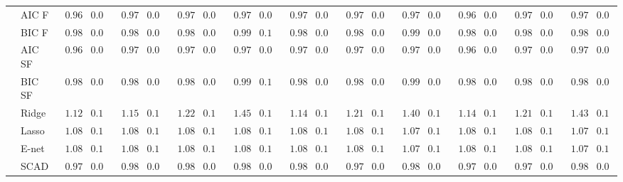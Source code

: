 \begin{tabular}{ll|ll|llllll|llllll|llllll}
 & AIC F  & $\phantom{0}0.96$ & $0.09$ & $\phantom{0}0.97$ & $0.09$ & $\phantom{0}0.97$ & $0.09$ & $\phantom{0}0.97$ & $0.09$ & $\phantom{0}0.97$ & $0.09$ & $\phantom{0}0.97$ & $0.09$ & $\phantom{0}0.97$ & $0.09$ & $\phantom{0}0.96$ & $0.09$ & $\phantom{0}0.97$ & $0.09$ & $\phantom{0}0.97$ & $0.09$ \\
 & BIC F  & $\phantom{0}0.98$ & $0.09$ & $\phantom{0}0.98$ & $0.09$ & $\phantom{0}0.98$ & $0.09$ & $\phantom{0}0.99$ & $0.10$ & $\phantom{0}0.98$ & $0.09$ & $\phantom{0}0.98$ & $0.09$ & $\phantom{0}0.99$ & $0.09$ & $\phantom{0}0.98$ & $0.09$ & $\phantom{0}0.98$ & $0.09$ & $\phantom{0}0.98$ & $0.09$ \\
 & AIC SF  & $\phantom{0}0.96$ & $0.09$ & $\phantom{0}0.97$ & $0.09$ & $\phantom{0}0.97$ & $0.09$ & $\phantom{0}0.97$ & $0.09$ & $\phantom{0}0.97$ & $0.09$ & $\phantom{0}0.97$ & $0.09$ & $\phantom{0}0.97$ & $0.09$ & $\phantom{0}0.96$ & $0.09$ & $\phantom{0}0.97$ & $0.09$ & $\phantom{0}0.97$ & $0.09$ \\
 & BIC SF  & $\phantom{0}0.98$ & $0.09$ & $\phantom{0}0.98$ & $0.09$ & $\phantom{0}0.98$ & $0.09$ & $\phantom{0}0.99$ & $0.10$ & $\phantom{0}0.98$ & $0.09$ & $\phantom{0}0.98$ & $0.09$ & $\phantom{0}0.99$ & $0.09$ & $\phantom{0}0.98$ & $0.09$ & $\phantom{0}0.98$ & $0.09$ & $\phantom{0}0.98$ & $0.09$ \\
 & Ridge  & $\phantom{0}1.12$ & $0.11$ & $\phantom{0}1.15$ & $0.10$ & $\phantom{0}1.22$ & $0.11$ & $\phantom{0}1.45$ & $0.13$ & $\phantom{0}1.14$ & $0.10$ & $\phantom{0}1.21$ & $0.11$ & $\phantom{0}1.40$ & $0.12$ & $\phantom{0}1.14$ & $0.11$ & $\phantom{0}1.21$ & $0.10$ & $\phantom{0}1.43$ & $0.12$ \\
 & Lasso  & $\phantom{0}1.08$ & $0.11$ & $\phantom{0}1.08$ & $0.11$ & $\phantom{0}1.08$ & $0.11$ & $\phantom{0}1.08$ & $0.11$ & $\phantom{0}1.08$ & $0.11$ & $\phantom{0}1.08$ & $0.11$ & $\phantom{0}1.07$ & $0.11$ & $\phantom{0}1.08$ & $0.11$ & $\phantom{0}1.08$ & $0.11$ & $\phantom{0}1.07$ & $0.11$ \\
 & E-net  & $\phantom{0}1.08$ & $0.11$ & $\phantom{0}1.08$ & $0.11$ & $\phantom{0}1.08$ & $0.11$ & $\phantom{0}1.08$ & $0.11$ & $\phantom{0}1.08$ & $0.11$ & $\phantom{0}1.08$ & $0.11$ & $\phantom{0}1.07$ & $0.11$ & $\phantom{0}1.08$ & $0.11$ & $\phantom{0}1.08$ & $0.11$ & $\phantom{0}1.07$ & $0.11$ \\
 & SCAD  & $\phantom{0}0.97$ & $0.09$ & $\phantom{0}0.98$ & $0.09$ & $\phantom{0}0.98$ & $0.09$ & $\phantom{0}0.98$ & $0.09$ & $\phantom{0}0.98$ & $0.09$ & $\phantom{0}0.97$ & $0.09$ & $\phantom{0}0.98$ & $0.09$ & $\phantom{0}0.97$ & $0.09$ & $\phantom{0}0.97$ & $0.09$ & $\phantom{0}0.98$ & $0.09$ \\

\end{tabular}
